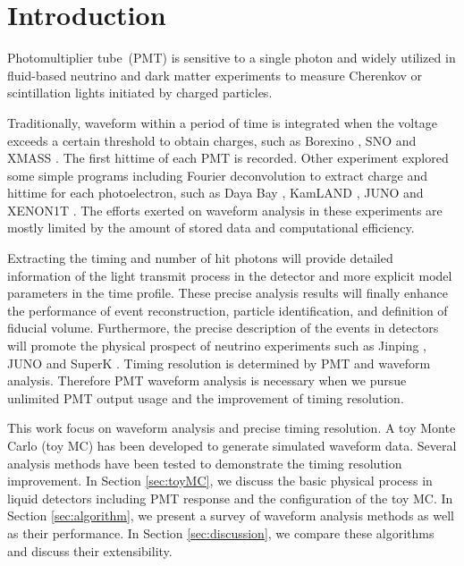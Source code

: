 \section{Introduction} %
\label{sec:introduction}

Photomultiplier tube~(PMT) is sensitive to a single photon and widely utilized in fluid-based neutrino and dark matter experiments to measure Cherenkov or scintillation lights initiated by charged particles.

Traditionally, waveform within a period of time is integrated when the voltage exceeds a certain threshold to obtain charges, such as Borexino \cite{lagomarsino_gateless_1999}, SNO \cite{dunger_event_2019} and XMASS \cite{abe_xmass_2013}. The first hittime of each PMT is recorded. Other experiment explored some simple programs including Fourier deconvolution to extract charge and hittime for each photoelectron, such as Daya Bay \cite{huang_flash_2018}, KamLAND \cite{the_kamland_collaboration_production_2010}, JUNO \cite{zhang_comparison_2019} and XENON1T \cite{aprile_xenon1t_2019}. The efforts exerted on waveform analysis in these experiments are mostly limited by the amount of stored data and computational efficiency. 

Extracting the timing and number of hit photons will provide detailed information of the light transmit process in the detector and more explicit model parameters in the time profile. These precise analysis results will finally enhance the performance of event reconstruction, particle identification, and definition of fiducial volume. Furthermore, the precise description of the events in detectors will promote the physical prospect of neutrino experiments such as Jinping \cite{beacom_physics_2017}, JUNO \cite{an_neutrino_2016} and SuperK \cite{noauthor_super-kamiokande_2003}. Timing resolution is determined by PMT and waveform analysis. Therefore PMT waveform analysis is necessary when we pursue 
unlimited PMT output usage and the improvement of timing resolution. 

This work focus on waveform analysis and precise timing resolution. A toy Monte Carlo (toy MC) has been developed to generate simulated waveform data. Several analysis methods have been tested to demonstrate the timing resolution improvement. In Section \ref{sec:toyMC}, we discuss the basic physical process in liquid detectors including PMT response and the configuration of the toy MC. In Section \ref{sec:algorithm}, we present a survey of waveform analysis methods as well as their performance. In Section \ref{sec:discussion}, we compare these algorithms and discuss their extensibility. 

